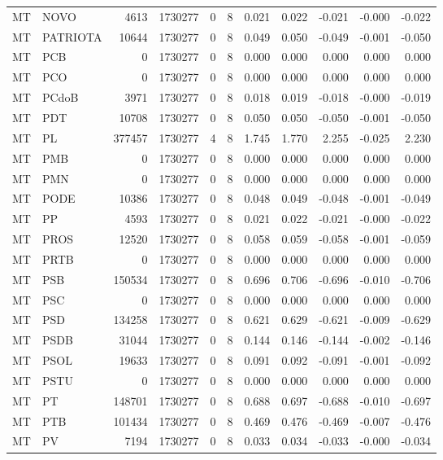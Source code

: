 \begin{landscape}
\begin{longtable}{llrrrrrrrrr}
MT & NOVO & 4613 & 1730277 & 0 & 8 & 0.021 & 0.022 & -0.021 & -0.000 & -0.022 \\
MT & PATRIOTA & 10644 & 1730277 & 0 & 8 & 0.049 & 0.050 & -0.049 & -0.001 & -0.050 \\
MT & PCB & 0 & 1730277 & 0 & 8 & 0.000 & 0.000 & 0.000 & 0.000 & 0.000 \\
MT & PCO & 0 & 1730277 & 0 & 8 & 0.000 & 0.000 & 0.000 & 0.000 & 0.000 \\
MT & PCdoB & 3971 & 1730277 & 0 & 8 & 0.018 & 0.019 & -0.018 & -0.000 & -0.019 \\
MT & PDT & 10708 & 1730277 & 0 & 8 & 0.050 & 0.050 & -0.050 & -0.001 & -0.050 \\
MT & PL & 377457 & 1730277 & 4 & 8 & 1.745 & 1.770 & 2.255 & -0.025 & 2.230 \\
MT & PMB & 0 & 1730277 & 0 & 8 & 0.000 & 0.000 & 0.000 & 0.000 & 0.000 \\
MT & PMN & 0 & 1730277 & 0 & 8 & 0.000 & 0.000 & 0.000 & 0.000 & 0.000 \\
MT & PODE & 10386 & 1730277 & 0 & 8 & 0.048 & 0.049 & -0.048 & -0.001 & -0.049 \\
MT & PP & 4593 & 1730277 & 0 & 8 & 0.021 & 0.022 & -0.021 & -0.000 & -0.022 \\
MT & PROS & 12520 & 1730277 & 0 & 8 & 0.058 & 0.059 & -0.058 & -0.001 & -0.059 \\
MT & PRTB & 0 & 1730277 & 0 & 8 & 0.000 & 0.000 & 0.000 & 0.000 & 0.000 \\
MT & PSB & 150534 & 1730277 & 0 & 8 & 0.696 & 0.706 & -0.696 & -0.010 & -0.706 \\
MT & PSC & 0 & 1730277 & 0 & 8 & 0.000 & 0.000 & 0.000 & 0.000 & 0.000 \\
MT & PSD & 134258 & 1730277 & 0 & 8 & 0.621 & 0.629 & -0.621 & -0.009 & -0.629 \\
MT & PSDB & 31044 & 1730277 & 0 & 8 & 0.144 & 0.146 & -0.144 & -0.002 & -0.146 \\
MT & PSOL & 19633 & 1730277 & 0 & 8 & 0.091 & 0.092 & -0.091 & -0.001 & -0.092 \\
MT & PSTU & 0 & 1730277 & 0 & 8 & 0.000 & 0.000 & 0.000 & 0.000 & 0.000 \\
MT & PT & 148701 & 1730277 & 0 & 8 & 0.688 & 0.697 & -0.688 & -0.010 & -0.697 \\
MT & PTB & 101434 & 1730277 & 0 & 8 & 0.469 & 0.476 & -0.469 & -0.007 & -0.476 \\
MT & PV & 7194 & 1730277 & 0 & 8 & 0.033 & 0.034 & -0.033 & -0.000 & -0.034 \\

\end{longtable}
\end{landscape}
